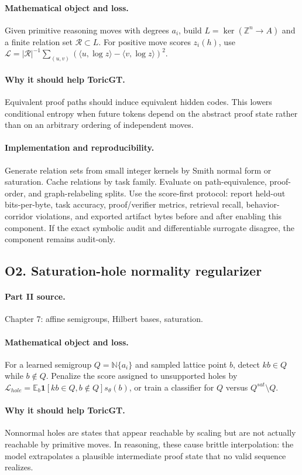 \documentclass[11pt]{article}
\theoremstyle{definition}
\newcommand{\NN}{\mathbb{N}}
\newcommand{\ZZ}{\mathbb{Z}}
\newcommand{\E}{\mathbb{E}}
\newcommand{\one}{\mathbf{1}}
\begin{document}
\paragraph{Mathematical object and loss.} Given primitive reasoning moves with degrees $a_i$, build $L=\ker(\ZZ^n\to A)$ and a finite relation set $\mathcal R\subset L$.  For positive move scores $z_i(h)$, use $\mathcal L=|\mathcal R|^{-1}\sum_{(u,v)}(\langle u,\log z\rangle-\langle v,\log z\rangle)^2$.
\paragraph{Why it should help ToricGT.} Equivalent proof paths should induce equivalent hidden codes.  This lowers conditional entropy when future tokens depend on the abstract proof state rather than on an arbitrary ordering of independent moves.
\paragraph{Implementation and reproducibility.} Generate relation sets from small integer kernels by Smith normal form or saturation.  Cache relations by task family.  Evaluate on path-equivalence, proof-order, and graph-relabeling splits.  Use the score-first protocol: report held-out bits-per-byte, task accuracy, proof/verifier metrics, retrieval recall, behavior-corridor violations, and exported artifact bytes before and after enabling this component.  If the exact symbolic audit and differentiable surrogate disagree, the component remains audit-only.


\subsection{O2. Saturation-hole normality regularizer}
\paragraph{Part II source.} Chapter 7: affine semigroups, Hilbert bases, saturation.
\paragraph{Mathematical object and loss.} For a learned semigroup $Q=\NN\{a_i\}$ and sampled lattice point $b$, detect $kb\in Q$ while $b\notin Q$.  Penalize the score assigned to unsupported holes by $\mathcal L_{hole}=\E_b \one[kb\in Q, b\notin Q]s_\theta(b)$, or train a classifier for $Q$ versus $Q^{sat}\setminus Q$.
\paragraph{Why it should help ToricGT.} Nonnormal holes are states that appear reachable by scaling but are not actually reachable by primitive moves.  In reasoning, these cause brittle interpolation: the model extrapolates a plausible intermediate proof state that no valid sequence realizes.
\end{document}
